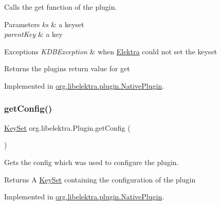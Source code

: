 Calls the get function of the plugin. 


\begin{DoxyParams}{Parameters}
{\em ks} & a keyset \\
\hline
{\em parent\+Key} & a key \\
\hline
\end{DoxyParams}

\begin{DoxyExceptions}{Exceptions}
{\em K\+D\+B\+Exception} & when \mbox{\hyperlink{interfaceorg_1_1libelektra_1_1Elektra}{Elektra}} could not set the keyset \\
\hline
\end{DoxyExceptions}
\begin{DoxyReturn}{Returns}
the plugin\textquotesingle{}s return value for get 
\end{DoxyReturn}


Implemented in \mbox{\hyperlink{classorg_1_1libelektra_1_1plugin_1_1NativePlugin_a766870e5f26cab4d497ed7c2fbc4abd9}{org.\+libelektra.\+plugin.\+Native\+Plugin}}.

\mbox{\label{interfaceorg_1_1libelektra_1_1Plugin_a95ee37a782d5bd32fd95478788652d44}} 
\subsubsection{\texorpdfstring{getConfig()}{getConfig()}}
{\footnotesize\ttfamily \mbox{\hyperlink{classorg_1_1libelektra_1_1KeySet}{Key\+Set}} org.\+libelektra.\+Plugin.\+get\+Config (\begin{DoxyParamCaption}{ }\end{DoxyParamCaption})}



Gets the config which was used to configure the plugin. 

\begin{DoxyReturn}{Returns}
A \mbox{\hyperlink{classorg_1_1libelektra_1_1KeySet}{Key\+Set}} containing the configuration of the plugin 
\end{DoxyReturn}


Implemented in \mbox{\hyperlink{classorg_1_1libelektra_1_1plugin_1_1NativePlugin_af9c78565029ed2ae38241759549e4b5a}{org.\+libelektra.\+plugin.\+Native\+Plugin}}.

\mbox{\label{interfaceorg_1_1libelektra_1_1Plugin_a51be1d6efdd3542c2ae503031bd16e04}} 
